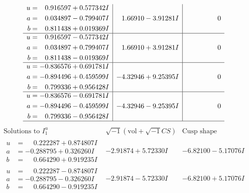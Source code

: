 \documentclass[1p]{elsarticle_modified}
\theoremstyle{definition}
\newcommand{\I}{\sqrt{-1}}
\begin{document}
$$\begin{array}{c|c|c}
\begin{aligned}
u &= \phantom{-}0.916597 + 0.577342 I \\
a &= \phantom{-}0.034897 - 0.799407 I \\
b &= \phantom{-}0.811438 + 0.019369 I\end{aligned}
 & \phantom{-}1.66910 - 3.91281 I & \phantom{-0.000000 } 0 \\ \hline\begin{aligned}
u &= \phantom{-}0.916597 - 0.577342 I \\
a &= \phantom{-}0.034897 + 0.799407 I \\
b &= \phantom{-}0.811438 - 0.019369 I\end{aligned}
 & \phantom{-}1.66910 + 3.91281 I & \phantom{-0.000000 } 0 \\ \hline\begin{aligned}
u &= -0.836576 + 0.691781 I \\
a &= -0.894496 + 0.459599 I \\
b &= \phantom{-}0.799336 + 0.956428 I\end{aligned}
 & -4.32946 + 9.25395 I & \phantom{-0.000000 } 0 \\ \hline\begin{aligned}
u &= -0.836576 - 0.691781 I \\
a &= -0.894496 - 0.459599 I \\
b &= \phantom{-}0.799336 - 0.956428 I\end{aligned}
 & -4.32946 - 9.25395 I & \phantom{-0.000000 } 0\\
 \hline 
 \end{array}$$\newpage$$\begin{array}{c|c|c}  
\text{Solutions to }I^u_{1}& \I (\text{vol} + \sqrt{-1}CS) & \text{Cusp shape}\\
 \hline 
\begin{aligned}
u &= \phantom{-}0.222287 + 0.874807 I \\
a &= -0.288795 + 0.326260 I \\
b &= \phantom{-}0.664290 + 0.919235 I\end{aligned}
 & -2.91874 + 5.72330 I & -6.82100 - 5.17076 I \\ \hline\begin{aligned}
u &= \phantom{-}0.222287 - 0.874807 I \\
a &= -0.288795 - 0.326260 I \\
b &= \phantom{-}0.664290 - 0.919235 I\end{aligned}
 & -2.91874 - 5.72330 I & -6.82100 + 5.17076 I \\ \hline\begin{aligned}

\end{aligned}
\end{array}$$
\end{document}
